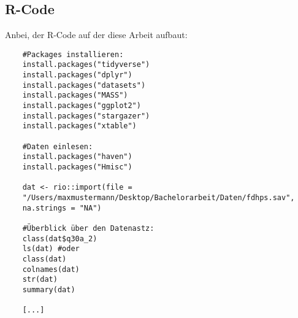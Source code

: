 \subsection{R-Code}

Anbei, der R-Code auf der diese Arbeit aufbaut:
\begin{tiny}
	\begin{lstlisting}
	#Packages installieren:
	install.packages("tidyverse")
	install.packages("dplyr")
	install.packages("datasets")
	install.packages("MASS")
	install.packages("ggplot2")
	install.packages("stargazer")
	install.packages("xtable")
	
	#Daten einlesen:
	install.packages("haven")
	install.packages("Hmisc") 
	
	dat <- rio::import(file = 
	"/Users/maxmustermann/Desktop/Bachelorarbeit/Daten/fdhps.sav",
	na.strings = "NA")
	
	#Überblick über den Datenastz:
	class(dat$q30a_2)
	ls(dat) #oder
	class(dat)
	colnames(dat)
	str(dat)
	summary(dat)
	
	[...]
	\end{lstlisting}
\end{tiny}

\newpage